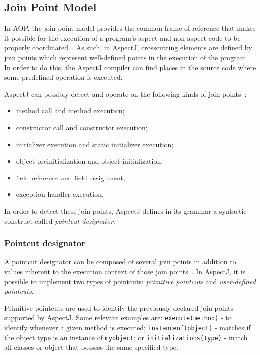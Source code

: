 \documentclass{template}
\begin{document}
\subsection{Join Point Model}

In AOP, the join point model provides the common frame of reference that makes it possible for the execution of a program's aspect and non-aspect code to be properly coordinated~\cite{Kiczales97aspect-orientedprogramming}. As such, in AspectJ, crosscutting elements are defined by join points which represent well-defined points in the execution of the program. In order to do this, the AspectJ compiler can find places in the source code where some predefined operation is executed. 

AspectJ can possibly detect and operate on the following kinds of join points~\cite{Kiselev2002}: 
\begin{itemize}
\item method call and method execution; 
\item constructor call and constructor execution; 
\item initializer execution and static initializer execution; 
\item object preinitialization and object initialization; 
\item field reference and field assignment; 
\item exception handler execution.
\end{itemize}

In order to detect these join points, AspectJ defines in its grammar a syntactic construct called \textit{pointcut designator}.

\subsubsection{Pointcut designator}

A pointcut designator can be composed of several join points in addition to values inherent to the execution context of those join points~\cite{Kiczales97aspect-orientedprogramming}. In AspectJ, it is possible to implement two types of pointcuts: \textit{primitive pointcuts} and \textit{user-defined pointcuts}.

Primitive pointcuts are used to identify the previously declared join points supported by AspectJ. Some relevant examples are: \texttt{execute(method)} - to identify whenever a given method is executed; \texttt{instanceof(object)} - matches if the object type is an instance of \texttt{myobject}; or \texttt{initializations(type)} - match all classes or object that possess the same specified type.
\end{document}
